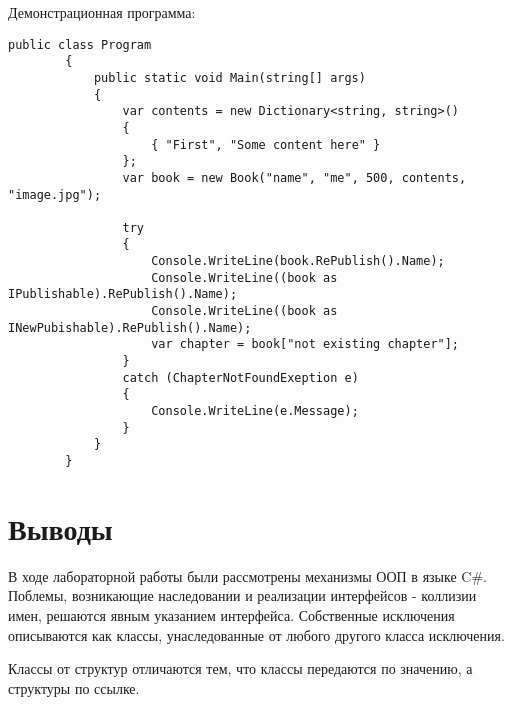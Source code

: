 \documentclass[a4paper,14pt]{extarticle}
\begin{document}
    Демонстрационная программа:

    \begin{lstlisting}[language={[Sharp]C}]
        public class Program
        {
            public static void Main(string[] args)
            {
                var contents = new Dictionary<string, string>()
                {
                    { "First", "Some content here" } 
                };
                var book = new Book("name", "me", 500, contents, "image.jpg");

                try 
                {
                    Console.WriteLine(book.RePublish().Name);
                    Console.WriteLine((book as IPublishable).RePublish().Name);
                    Console.WriteLine((book as INewPubishable).RePublish().Name);
                    var chapter = book["not existing chapter"];
                }
                catch (ChapterNotFoundExeption e) 
                {
                    Console.WriteLine(e.Message);
                }
            }
        }
    \end{lstlisting}

    \section{Выводы}

    В ходе лабораторной работы были рассмотрены механизмы ООП в языке C\#.
    Поблемы, возникающие наследовании и реализации интерфейсов - коллизии имен, 
    решаются явным указанием интерфейса. Собственные исключения описываются
    как классы, унаследованные от любого другого класса исключения.

    Классы от структур отличаются тем, что классы передаются по значению,
    а структуры по ссылке.
\end{document}

